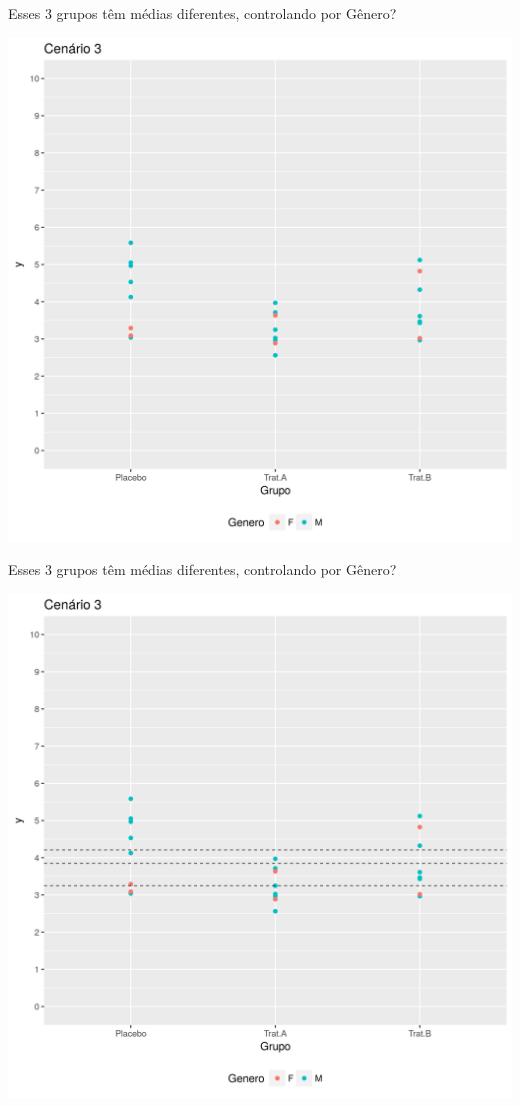 \documentclass{beamer}
\begin{document}
\begin{frame}{Esses 3 grupos têm médias diferentes, controlando por Gênero?}
  \begin{center}
    \includegraphics[height=.9\textheight]{Cap13-30/cenario12}
  \end{center}
\end{frame}

\begin{frame}{Esses 3 grupos têm médias diferentes, controlando por Gênero?}
  \begin{center}
    \includegraphics[height=.9\textheight]{Cap13-30/cenario12_medias}

  \end{center}
\end{frame}
\end{document}
